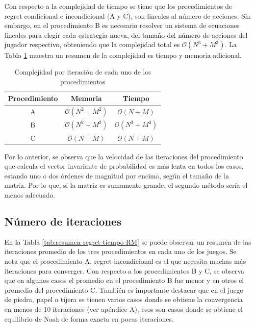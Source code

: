 Con respecto a la complejidad de tiempo se tiene que los procedimientos de regret condicional e incondicional (A y C), son lineales al número de acciones. Sin embargo, en el procedimiento B es necesario resolver un sistema de ecuaciones lineales para elegir cada estrategia nueva, del tamaño del número de acciones del jugador respectivo, obteniendo que la complejidad total es $\mathcal{O}(N^3 + M^3)$. La Tabla \ref{tab:complejidades-iteraciones} muestra un resumen de la complejidad es tiempo y memoria adicional.

\begin{table}[ht]
    \centering
    \begin{tabular}{c|c|c}
         Procedimiento & Memoria & Tiempo  \\ \hline
         A & $\mathcal{O}(N^2 + M^2)$ & $\mathcal{O}(N + M)$ \\ 
         B & $\mathcal{O}(N^2 + M^2)$ & $\mathcal{O}(N^3 + M^3)$ \\
         C & $\mathcal{O}(N + M)$     & $\mathcal{O}(N + M)$ \\ \hline
    \end{tabular}
    \caption{Complejidad por iteración de cada uno de los procedimientos}
    \label{tab:complejidades-iteraciones}
\end{table}

Por lo anterior, se observa que la velocidad de las iteraciones del procedimiento que calcula el vector invariante de probabilidad es más lenta en todos los casos, estando uno o dos órdenes de magnitud por encima, según el tamaño de la matriz. Por lo que, si la matriz es sumamente grande, el segundo método sería el menos adecuado.

\subsection{Número de iteraciones}

En la Tabla \ref{tab:resumen-regret-tiempo-RM} se puede observar un resumen de las iteraciones promedio de los tres procedimientos en cada uno de los juegos. Se nota que el procedimiento A, regret incondicional es el que necesita muchas más iteraciones para converger. Con respecto a los procedimientos B y C, se observa que en algunos casos el promedio en el procedimiento B fue menor y en otros el promedio del procedimiento C. También es importante destacar que en el juego de piedra, papel o tijera se tienen varios casos donde se obtiene la convergencia en menos de $10$ iteraciones (ver apéndice A), esos son casos donde se obtiene el equilibrio de Nash de forma exacta en pocas iteraciones.

